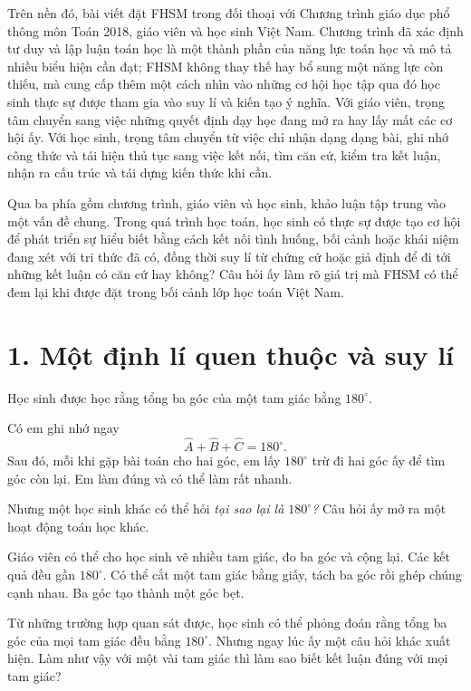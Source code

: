 Trên nền đó, bài viết đặt FHSM trong đối thoại với Chương trình giáo dục phổ thông môn Toán 2018, giáo viên và học sinh Việt Nam. Chương trình đã xác định tư duy và lập luận toán học là một thành phần của năng lực toán học và mô tả nhiều biểu hiện cần đạt; FHSM không thay thế hay bổ sung một năng lực còn thiếu, mà cung cấp thêm một cách nhìn vào những cơ hội học tập qua đó học sinh thực sự được tham gia vào suy lí và kiến tạo ý nghĩa. Với giáo viên, trọng tâm chuyển sang việc những quyết định dạy học đang mở ra hay lấy mất các cơ hội ấy. Với học sinh, trọng tâm chuyển từ việc chỉ nhận dạng dạng bài, ghi nhớ công thức và tái hiện thủ tục sang việc kết nối, tìm căn cứ, kiểm tra kết luận, nhận ra cấu trúc và tái dựng kiến thức khi cần.

Qua ba phía gồm chương trình, giáo viên và học sinh, khảo luận tập trung vào một vấn đề chung. Trong quá trình học toán, học sinh có thực sự được tạo cơ hội để phát triển sự hiểu biết bằng cách kết nối tình huống, bối cảnh hoặc khái niệm đang xét với tri thức đã có, đồng thời suy lí từ chứng cứ hoặc giả định để đi tới những kết luận có căn cứ hay không? Câu hỏi ấy làm rõ giá trị mà FHSM có thể đem lại khi được đặt trong bối cảnh lớp học toán Việt Nam.

\endgroup

\clearpage

\section*{1. Một định lí quen thuộc và suy lí}

Học sinh được học rằng tổng ba góc của một tam giác bằng $180^\circ$.

Có em ghi nhớ ngay
$$
\widehat A+\widehat B+\widehat C=180^\circ.
$$
Sau đó, mỗi khi gặp bài toán cho hai góc, em lấy $180^\circ$ trừ đi hai góc ấy để tìm góc còn lại. Em làm đúng và có thể làm rất nhanh.

Nhưng một học sinh khác có thể hỏi \emph{tại sao lại là $180^\circ$?} Câu hỏi ấy mở ra một hoạt động toán học khác.

Giáo viên có thể cho học sinh vẽ nhiều tam giác, đo ba góc và cộng lại. Các kết quả đều gần $180^\circ$. Có thể cắt một tam giác bằng giấy, tách ba góc rồi ghép chúng cạnh nhau. Ba góc tạo thành một góc bẹt.

Từ những trường hợp quan sát được, học sinh có thể phỏng đoán rằng tổng ba góc của mọi tam giác đều bằng $180^\circ$. Nhưng ngay lúc ấy một câu hỏi khác xuất hiện. Làm như vậy với một vài tam giác thì làm sao biết kết luận đúng với mọi tam giác?

